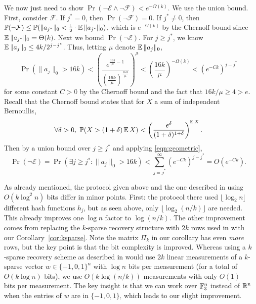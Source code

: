 We now just need to show $\Pr(\neg\mathcal{E} \wedge \neg\mathcal{F}) < e^{-\Omega(k)}$. We use the union bound. First, consider $\mathcal{F}$. If $j^* = 0$, then $\Pr(\neg\mathcal{F}) = 0$. If $j^*\neq 0$, then $\operatorname*{\mathbb{P}}(\neg\mathcal{F}) \le \operatorname*{\mathbb{P}}(\|a_{j^*}\|_0 < \frac 12 \cdot\operatorname*{\mathbb{E}}\|a_{j^*}\|_0)$, which is $e^{-\Omega(k)}$ by the Chernoff bound since $\operatorname*{\mathbb{E}}\|a_{j^*}\|_0 = \Theta(k)$. Next we bound $\Pr(\neg \mathcal{E})$. For $j\ge j^*$, we know $\operatorname*{\mathbb{E}}\|a_j\|_0 \le 4k/2^{j-j^*}$. Thus, letting $\mu$ denote $\operatorname*{\mathbb{E}}\|a_j\|_0$, 
\begin{equation}
\Pr(\|a_j\|_0 > 16k) < \left(\frac{e^{\frac{16k}{\mu} - 1}}{(\frac{16k}{\mu})^{\frac{16k}{\mu}}}\right)^\mu < \left(\frac{16k}{\mu}\right)^{-\Omega(k)} < (e^{-Ck})^{j-j^*}\label{eqn:geometric}
\end{equation}
for some constant $C>0$ by the Chernoff bound and the fact that $16k/\mu \ge 4 > e$. Recall that the Chernoff bound states that for $X$ a sum of independent Bernoullis,
$$
\forall \delta > 0,\ \operatorname*{\mathbb{P}}(X > (1+\delta) \operatorname*{\mathbb{E}} X) < \left(\frac{e^\delta}{(1+\delta)^{1+\delta}}\right)^{\operatorname*{\mathbb{E}} X} .
$$
Then by a union bound over $j\ge j^*$ and applying \eqref{eqn:geometric},
$$
\Pr(\neg \mathcal{E}) = \Pr(\exists j\ge j^*: \|a_j\|_0 > 16k) < \sum_{j=j^*}^\infty (e^{-Ck})^{j-j^*} = O(e^{-Ck}) .
$$

\begin{remark}\label{rem:recov}
\textup{
As already mentioned, the protocol given above and the one described in \cite{JowhariST11} using $O(k\log^2 n)$ bits differ in minor points. First: the protocol there used $\lfloor\log_2 n\rfloor$ different hash functions $h_j$, but as seen above, only $\lfloor \log_2(n/k)\rfloor$ are needed. This already improves one $\log n$ factor to $\log(n/k)$. The other improvement comes from replacing the $k$-sparse recovery structure with $2k$ rows used in \cite{JowhariST11} with our Corollary~\ref{cor:ksparse}. Note the matrix $\Pi_k$ in our corollary has even {\it more} rows, but the key point is that the bit complexity is improved. Whereas using a $k$-sparse recovery scheme as described in \cite{JowhariST11} would use $2k$ linear measurements of a $k$-sparse vector $w\in\{-1,0,1\}^n$ with $\log n$ bits per measurement (for a total of $O(k\log n)$ bits), we use $O(k\log(n/k))$ measurements with only $O(1)$ bits per measurement. The key insight is that we can work over $\mathbb{F}_3^n$ instead of $\mathbb{R}^n$ when the entries of $w$ are in $\{-1,0,1\}$, which leads to our slight improvement.
}
\end{remark}